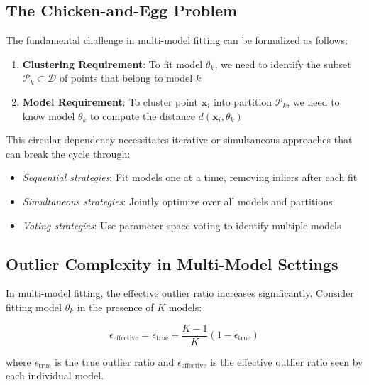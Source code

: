 \documentclass[12pt]{article}
\renewcommand{\vec}[1]{\mathbf{#1}}
\begin{document}
\subsection{The Chicken-and-Egg Problem}
\label{subsec:chicken_egg}

The fundamental challenge in multi-model fitting can be formalized as follows:

\begin{enumerate}
    \item \textbf{Clustering Requirement}: To fit model $\theta_k$, we need to identify the subset $\mathcal{P}_k \subset \mathcal{D}$ of points that belong to model $k$
    \item \textbf{Model Requirement}: To cluster point $\vec{x}_i$ into partition $\mathcal{P}_k$, we need to know model $\theta_k$ to compute the distance $d(\vec{x}_i, \theta_k)$
\end{enumerate}

This circular dependency necessitates iterative or simultaneous approaches that can break the cycle through:
\begin{itemize}
    \item \textit{Sequential strategies}: Fit models one at a time, removing inliers after each fit
    \item \textit{Simultaneous strategies}: Jointly optimize over all models and partitions
    \item \textit{Voting strategies}: Use parameter space voting to identify multiple models
\end{itemize}

\subsection{Outlier Complexity in Multi-Model Settings}
\label{subsec:multimodel_outliers}

In multi-model fitting, the effective outlier ratio increases significantly. Consider fitting model $\theta_k$ in the presence of $K$ models:

\begin{equation}
    \epsilon_{\text{effective}} = \epsilon_{\text{true}} + \frac{K-1}{K}(1 - \epsilon_{\text{true}})
    \label{eq:effective_outlier_ratio}
\end{equation}

where $\epsilon_{\text{true}}$ is the true outlier ratio and $\epsilon_{\text{effective}}$ is the effective outlier ratio seen by each individual model.
\end{document}
